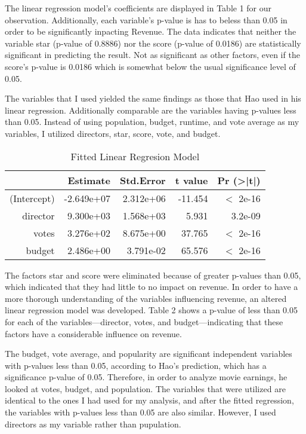 \documentclass[12pt]{article}
\begin{document}
The linear regression model's coefficients are displayed in Table 1 for our observation. 
Additionally, each variable's p-value is has to beless than 0.05 in order to be significantly
inpacting Revenue. The data indicates that neither the variable star (p-value of 0.8886) 
nor the score (p-value of 0.0186) are statistically significant in predicting the result.
Not as significant as other factors, even if the score's p-value is 0.0186 which is somewhat
below the usual significance level of 0.05. 

The variables that I used yielded the same findings as those that Hao used in his linear regression.
Additionally comparable are the variables having p-values less than 0.05. Instead of using population,
budget, runtime, and vote average as my variables, I utilized directors, star, score, vote, and budget.

\begin{table}[h]
\caption{Fitted Linear Regresion Model}
\centering
\begin{tabular}{rrrrr}
\hline
 & Estimate   & Std.Error & t value & Pr (\textgreater|t|) \\ 
\hline
(Intercept) & -2.649e+07 & 2.312e+06 & -11.454 & $<$ 2e-16 \\
director    & 9.300e+03  & 1.568e+03 & 5.931   & 3.2e-09 \\
votes       & 3.276e+02  & 8.675e+00 & 37.765  & $<$ 2e-16 \\
budget      & 2.486e+00  & 3.791e-02 & 65.576  & $<$ 2e-16 \\
\hline
\end{tabular}
\end{table}

The factors star and score were eliminated because of greater p-values than 0.05, 
which indicated that they had little to no impact on revenue. In order to have a 
more thorough understanding of the variables influencing revenue, an altered linear 
regression model was developed. Table 2 shows a p-value of less than 0.05 for each 
of the variables—director, votes, and budget—indicating that these factors have a
considerable influence on revenue.

The budget, vote average, and popularity are significant independent variables with
p-values less than 0.05, according to Hao's prediction, which has a significance p-value
of 0.05. Therefore, in order to analyze movie earnings, he looked at votes, budget, and 
population. The variables that were utilized are identical to the ones I had used for my 
analysis, and after the fitted regression, the variables with p-values less than 0.05 are
also similar. However, I used directors as my variable rather than pupulation.
\end{document}
